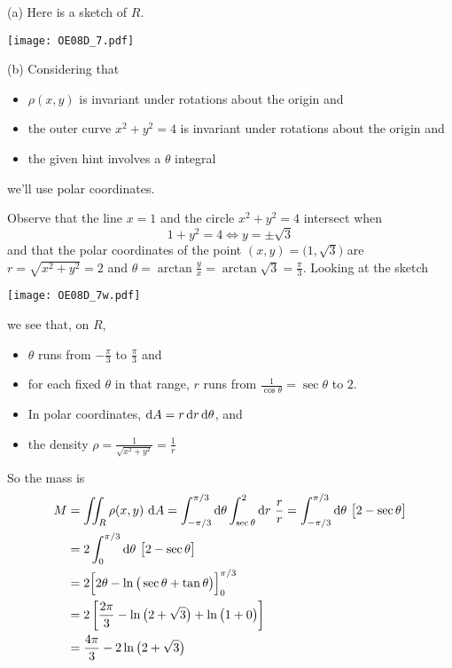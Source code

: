 \begin{solution}
(a) Here is a sketch of $R$.
\begin{center}
     \texttt{[image: OE08D\_7.pdf]}
\end{center}

(b) Considering that
\begin{itemize}
\item
$\rho(x,y)$ is invariant under rotations about the origin and
\item
the outer curve $x^2+y^2=4$  is invariant under rotations about the origin and
\item
the given hint involves a $\theta$ integral
\end{itemize}
we'll use polar coordinates. 

Observe that the line $x=1$ and the circle $x^2+y^2=4$ 
intersect when
\begin{equation*}
1+y^2=4 
\iff y=\pm\sqrt{3}
\end{equation*}
and that the polar coordinates of the point $(x,y)=\big(1,\sqrt{3}\big)$
are $r=\sqrt{x^2+y^2}=2$ and $\theta=\arctan\frac{y}{x}=\arctan \sqrt{3}
=\frac{\pi}{3}$. Looking at the sketch 
\begin{center}
     \texttt{[image: OE08D\_7w.pdf]}
\end{center}
we see that, on $R$,
\begin{itemize}
\item
$\theta$ runs from $-\frac{\pi}{3}$ to $\frac{\pi}{3}$ and
\item
for each fixed $\theta$ in that range, $r$ runs from $\frac{1}{\cos\theta}
=\sec\theta$ to $2$.
\item
In polar coordinates, $\mathrm{d}A=r\,\mathrm{d}r\,\mathrm{d}\theta$, and
\item 
the density $\rho =\frac{1}{\sqrt{x^2+y^2}} =\frac{1}{r}$
\end{itemize}
So the mass is
\begin{align*}
M&=\dblInt_R \rho(x,y)\ \dee{A}
=\int_{-\pi/3}^{\pi/3}\dee{\theta}\int_{\sec\theta}^2\dee{r}\ \frac{r}{r}
=\int_{-\pi/3}^{\pi/3}\dee{\theta}\ \big[2-\sec\theta\big] \\
&=2\int_0^{\pi/3}\dee{\theta}\ \big[2-\sec\theta\big] \\
&= 2\Big[2\theta - \ln\big(\sec\theta+\tan\theta\big)\Big]_0^{\pi/3} \\
&= 2\left[\frac{2\pi}{3} - \ln\big(2+\sqrt{3}\big)
            + \ln\big(1+0\big)\right] \\
&= \frac{4\pi}{3} - 2\ln\big(2+\sqrt{3}\big)
\end{align*}



\end{solution}
